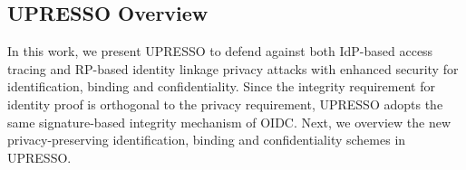 \begin{comment}
\end{itemize}
Additionally, it introduces another challenge to provide distinct user identifier while hiding RP's identity
\begin{itemize}
\item \textbf{RP is unable to identify the user: }To hide RP's identity, the single RP's multiple authentication requests should be considered from different RPs by IdP. However, the user identifier provided by IdP is solely bound with an RP to avoid linking the user through RPs' collusion. It means that the single user's multiple identifiers for one RP will never be constant. Therefore, RP is unable to identify the user no longer.
\end{itemize}
\end{comment}


\subsection{UPRESSO Overview}
\label{subsec:solutions}
In this work, we present UPRESSO to defend against both IdP-based access tracing and RP-based identity linkage privacy attacks with enhanced security for identification, binding and confidentiality. %
Since the integrity requirement for identity proof is orthogonal to the privacy requirement, UPRESSO adopts the same signature-based integrity mechanism of OIDC.
Next, we overview the new privacy-preserving identification, binding and confidentiality schemes in UPRESSO.

